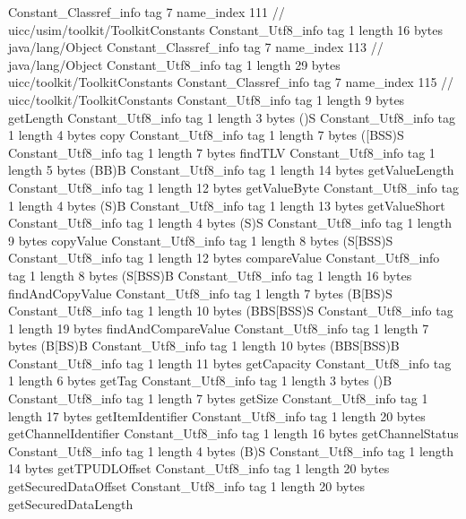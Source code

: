 {{{		}
		Constant_Classref_info {
			tag	7
			name_index	111		// uicc/usim/toolkit/ToolkitConstants
		}
		Constant_Utf8_info {
			tag	1
			length	16
			bytes	java/lang/Object
		}
		Constant_Classref_info {
			tag	7
			name_index	113		// java/lang/Object
		}
		Constant_Utf8_info {
			tag	1
			length	29
			bytes	uicc/toolkit/ToolkitConstants
		}
		Constant_Classref_info {
			tag	7
			name_index	115		// uicc/toolkit/ToolkitConstants
		}
		Constant_Utf8_info {
			tag	1
			length	9
			bytes	getLength
		}
		Constant_Utf8_info {
			tag	1
			length	3
			bytes	()S
		}
		Constant_Utf8_info {
			tag	1
			length	4
			bytes	copy
		}
		Constant_Utf8_info {
			tag	1
			length	7
			bytes	([BSS)S
		}
		Constant_Utf8_info {
			tag	1
			length	7
			bytes	findTLV
		}
		Constant_Utf8_info {
			tag	1
			length	5
			bytes	(BB)B
		}
		Constant_Utf8_info {
			tag	1
			length	14
			bytes	getValueLength
		}
		Constant_Utf8_info {
			tag	1
			length	12
			bytes	getValueByte
		}
		Constant_Utf8_info {
			tag	1
			length	4
			bytes	(S)B
		}
		Constant_Utf8_info {
			tag	1
			length	13
			bytes	getValueShort
		}
		Constant_Utf8_info {
			tag	1
			length	4
			bytes	(S)S
		}
		Constant_Utf8_info {
			tag	1
			length	9
			bytes	copyValue
		}
		Constant_Utf8_info {
			tag	1
			length	8
			bytes	(S[BSS)S
		}
		Constant_Utf8_info {
			tag	1
			length	12
			bytes	compareValue
		}
		Constant_Utf8_info {
			tag	1
			length	8
			bytes	(S[BSS)B
		}
		Constant_Utf8_info {
			tag	1
			length	16
			bytes	findAndCopyValue
		}
		Constant_Utf8_info {
			tag	1
			length	7
			bytes	(B[BS)S
		}
		Constant_Utf8_info {
			tag	1
			length	10
			bytes	(BBS[BSS)S
		}
		Constant_Utf8_info {
			tag	1
			length	19
			bytes	findAndCompareValue
		}
		Constant_Utf8_info {
			tag	1
			length	7
			bytes	(B[BS)B
		}
		Constant_Utf8_info {
			tag	1
			length	10
			bytes	(BBS[BSS)B
		}
		Constant_Utf8_info {
			tag	1
			length	11
			bytes	getCapacity
		}
		Constant_Utf8_info {
			tag	1
			length	6
			bytes	getTag
		}
		Constant_Utf8_info {
			tag	1
			length	3
			bytes	()B
		}
		Constant_Utf8_info {
			tag	1
			length	7
			bytes	getSize
		}
		Constant_Utf8_info {
			tag	1
			length	17
			bytes	getItemIdentifier
		}
		Constant_Utf8_info {
			tag	1
			length	20
			bytes	getChannelIdentifier
		}
		Constant_Utf8_info {
			tag	1
			length	16
			bytes	getChannelStatus
		}
		Constant_Utf8_info {
			tag	1
			length	4
			bytes	(B)S
		}
		Constant_Utf8_info {
			tag	1
			length	14
			bytes	getTPUDLOffset
		}
		Constant_Utf8_info {
			tag	1
			length	20
			bytes	getSecuredDataOffset
		}
		Constant_Utf8_info {
			tag	1
			length	20
			bytes	getSecuredDataLength
}}}
